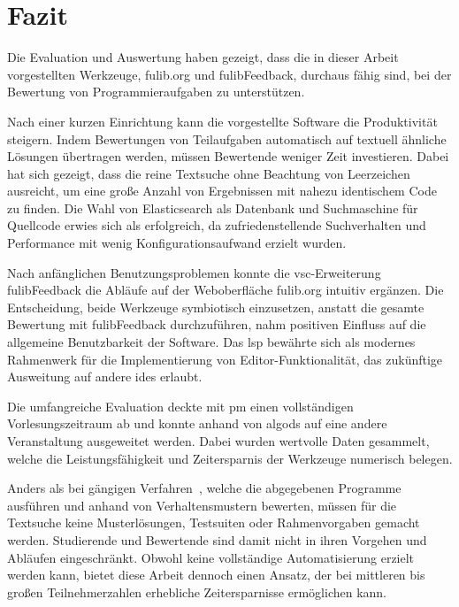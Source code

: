 \chapter{Fazit}\label{ch:conclusion}

Die Evaluation und Auswertung haben gezeigt, dass die in dieser Arbeit vorgestellten Werkzeuge, fulib.org und fulibFeedback, durchaus fähig sind, bei der Bewertung von Programmieraufgaben zu unterstützen.

Nach einer kurzen Einrichtung kann die vorgestellte Software die Produktivität steigern.
Indem Bewertungen von Teilaufgaben automatisch auf textuell ähnliche Lösungen übertragen werden, müssen Bewertende weniger Zeit investieren.
Dabei hat sich gezeigt, dass die reine Textsuche ohne Beachtung von Leerzeichen ausreicht, um eine große Anzahl von Ergebnissen mit nahezu identischem Code zu finden.
Die Wahl von Elasticsearch als Datenbank und Suchmaschine für Quellcode erwies sich als erfolgreich, da zufriedenstellende Suchverhalten und Performance mit wenig Konfigurationsaufwand erzielt wurden.

Nach anfänglichen Benutzungsproblemen konnte die \ac{vsc}-Erweiterung fulibFeedback die Abläufe auf der Weboberfläche fulib.org intuitiv ergänzen.
Die Entscheidung, beide Werkzeuge symbiotisch einzusetzen, anstatt die gesamte Bewertung mit fulibFeedback durchzuführen, nahm positiven Einfluss auf die allgemeine Benutzbarkeit der Software.
Das \acl{lsp} bewährte sich als modernes Rahmenwerk für die Implementierung von Editor-Funktionalität, das zukünftige Ausweitung auf andere \acp{ide} erlaubt.

Die umfangreiche Evaluation deckte mit \ac{pm} einen vollständigen Vorlesungszeitraum ab und konnte anhand von \acl{algods} auf eine andere Veranstaltung ausgeweitet werden.
Dabei wurden wertvolle Daten gesammelt, welche die Leistungsfähigkeit und Zeitersparnis der Werkzeuge numerisch belegen.

Anders als bei gängigen Verfahren~\cite{jackson-1997-assyst,edwards-2008-web-cat,enstroem-et-al-2011,vander-zanden-2012}, welche die abgegebenen Programme ausführen und anhand von Verhaltensmustern bewerten, müssen für die Textsuche keine Musterlösungen, Testsuiten oder Rahmenvorgaben gemacht werden.
Studierende und Bewertende sind damit nicht in ihren Vorgehen und Abläufen eingeschränkt.
Obwohl keine vollständige Automatisierung erzielt werden kann, bietet diese Arbeit dennoch einen Ansatz, der bei mittleren bis großen Teilnehmerzahlen erhebliche Zeitersparnisse ermöglichen kann.
